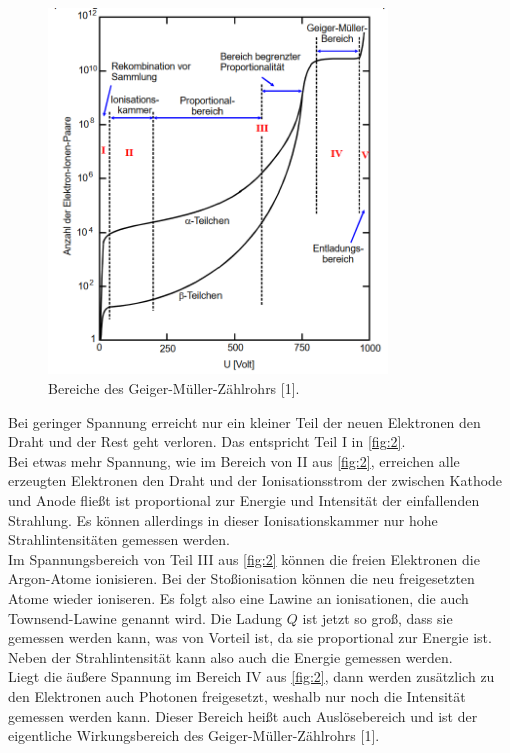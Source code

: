 \begin{figure}[H] 
  \centering 
  \includegraphics[width=9cm]{2} 
  \caption{Bereiche des Geiger-Müller-Zählrohrs [1].} \label{fig:2} 
\end{figure}

Bei geringer Spannung erreicht nur ein kleiner Teil der neuen Elektronen den Draht und der Rest geht verloren. Das entspricht Teil I in \autoref{fig:2}.\\ 
Bei etwas mehr Spannung, wie im Bereich von II aus \autoref{fig:2}, erreichen alle erzeugten Elektronen den Draht und der Ionisationsstrom der zwischen Kathode und Anode fließt ist proportional zur Energie und Intensität der einfallenden Strahlung. Es können allerdings in dieser Ionisationskammer nur hohe Strahlintensitäten gemessen werden.\\
Im Spannungsbereich von Teil III aus \autoref{fig:2} können die freien Elektronen die Argon-Atome ionisieren. Bei der Stoßionisation können die neu freigesetzten Atome wieder ioniseren. Es folgt also eine Lawine an ionisationen, die auch Townsend-Lawine genannt wird. Die Ladung $Q$ ist jetzt so groß, dass sie gemessen werden kann, was von Vorteil ist, da sie proportional zur Energie ist. Neben der Strahlintensität kann also auch die Energie gemessen werden. \\
Liegt die äußere Spannung im Bereich IV aus \autoref{fig:2}, dann werden zusätzlich zu den Elektronen auch Photonen freigesetzt, weshalb nur noch die Intensität gemessen werden kann. Dieser Bereich heißt auch Auslösebereich und ist der eigentliche Wirkungsbereich des Geiger-Müller-Zählrohrs [1].

